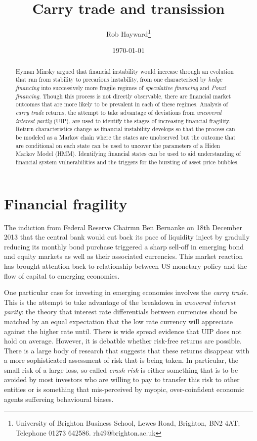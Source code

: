 \documentclass[12pt, a4paper, oneside]{article} %
\begin{document}
\title{Carry trade and transission}
\author{Rob Hayward\footnote{University of Brighton Business School, Lewes Road, Brighton, BN2 4AT; Telephone 01273 642586.  rh49@brighton.ac.uk}} 
\date{\today}
\maketitle
\begin{abstract}
Hyman Minsky argued that financial instability would increase through an evolution that ran from stability to precarious instability, from one characterised by \emph{hedge financing} into successively more fragile regimes of \emph{speculative financing} and \emph{Ponzi financing}.  Though this process is not directly observable, there are financial market outcomes that are more likely to be prevalent in each of these regimes.  Analysis of \emph{carry trade} returns, the attempt to take advantage of deviations from \emph{uncovered interest partiy} (UIP), are used to identify the stages of increasing financial fragility.  Return characteristics change as financial instability develops so that the process can be modeled as a Markov chain where the states are unobserved but the outcome that are conditional on each state can be used to uncover the parameters of a Hiden Markov Model (HMM).   Identifying financial states can be used to aid understanding of financial system vulnerabilities and the triggers for the bursting of asset price bubbles. 

\end{abstract}

\section{Financial fragility}
The indiction from Federal Reserve Chairmn Ben Bernanke on 18th December 2013 that the central bank would cut back its pace of liquidity inject by gradully reducing its monthly bond purchase triggered a sharp sell-off in emerging bond and equity markets as well as their associated currencies.  This market reaction has brought attention back to relationship between US monetary policy and the flow of capital to emerging economies.  

One particular case for investing in emerging economies involves the \emph{carry trade}.  This is the attempt to take advantage of the breakdown in \emph{unovered interest parity}: the theory that interest rate differentials between currencies shoud be matched by an equal expectation that the low rate currency will appreciate against the higher rate until.  There is wide spread evidence that UIP does not hold on average.  However, it is debatble whether risk-free returns are possible.  There is a large body of research that suggests that these returns disappear with a more sophisticated assessment of risk that is being taken.  In particular, the small risk of a large loss, so-called \emph{crash risk} is either something that is to be avoided by most investors who are willing to pay to transfer this risk to other entities or is something that mis-perceived by myopic, over-coinfident economic agents suffereing behavioural biases.  
\end{document}
